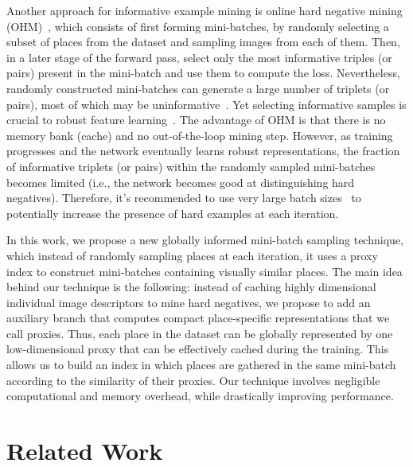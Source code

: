 \documentclass{bmvc2k}
\begin{document}
Another approach for informative example mining is online hard negative mining (OHM)~\cite{hermans2017defense, wu2017sampling}, which consists of first forming mini-batches, by randomly selecting a subset of places from the dataset and sampling images from each of them. Then, in a later stage of the forward pass, select only the most informative triples (or pairs) present in the mini-batch and use them to compute the loss. Nevertheless, randomly constructed mini-batches can generate a large number of triplets (or pairs), most of which may be uninformative~\cite{hermans2017defense}. Yet selecting informative samples is crucial to robust feature learning~\cite{musgrave2020metric}. The advantage of OHM is that there is no memory bank (cache) and no out-of-the-loop mining step. However, as training progresses and the network eventually learns robust representations, the fraction of informative triplets (or pairs) within the randomly sampled mini-batches becomes limited (i.e., the network becomes good at distinguishing hard negatives). Therefore, it's recommended to use very large batch sizes~\cite{hermans2017defense} to potentially increase the presence of hard examples at each iteration.

In this work, we propose a new globally informed mini-batch sampling technique, which instead of randomly sampling places at each iteration, it uses a proxy index to construct mini-batches containing visually similar places. The main idea behind our technique is the following: instead of caching highly dimensional individual image descriptors to mine hard negatives, we propose to add an auxiliary branch that computes compact place-specific representations that we call proxies. Thus, each place in the dataset can be globally represented by one low-dimensional proxy that can be effectively cached during the training. This allows us to build an index in which places are gathered in the same mini-batch according to the similarity of their proxies. Our technique involves negligible computational and memory overhead, while drastically improving performance.



\section{Related Work}
\label{sec:related}
\end{document}
